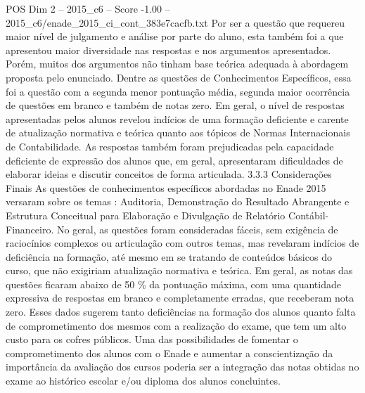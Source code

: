 \begin{textsample}{POS Dim 2 – 2015\_c6 – Score -1.00 – 2015\_c6/enade\_2015\_ci\_cont\_383e7cacfb.txt}
Por ser a questão que requereu maior nível de julgamento e análise por parte do aluno, esta também foi a que apresentou maior diversidade nas respostas e nos argumentos apresentados.
Porém, muitos dos argumentos não tinham base teórica adequada à abordagem proposta pelo enunciado.
Dentre as questões de Conhecimentos Específicos, essa foi a questão com a segunda menor pontuação média, segunda maior ocorrência de questões em branco e também de notas zero.
Em geral, o nível de respostas apresentadas pelos alunos revelou indícios de uma formação deficiente e carente de atualização normativa e teórica quanto aos tópicos de Normas Internacionais de Contabilidade.
As respostas também foram prejudicadas pela capacidade deficiente de expressão dos alunos que, em geral, apresentaram dificuldades de elaborar ideias e discutir conceitos de forma articulada. 3.3.3 Considerações Finais As questões de conhecimentos específicos abordadas no Enade 2015 versaram sobre os temas : Auditoria, Demonstração do Resultado Abrangente e Estrutura Conceitual para Elaboração e Divulgação de Relatório Contábil-Financeiro.
No geral, as questões foram consideradas fáceis, sem exigência de raciocínios complexos ou articulação com outros temas, mas revelaram indícios de deficiência na formação, até mesmo em se tratando de conteúdos básicos do curso, que não exigiriam atualização normativa e teórica.
Em geral, as notas das questões ficaram abaixo de 50 \% da pontuação máxima, com uma quantidade expressiva de respostas em branco e completamente erradas, que receberam nota zero.
Esses dados sugerem tanto deficiências na formação dos alunos quanto falta de comprometimento dos mesmos com a realização do exame, que tem um alto custo para os cofres públicos.
Uma das possibilidades de fomentar o comprometimento dos alunos com o Enade e aumentar a conscientização da importância da avaliação dos cursos poderia ser a integração das notas obtidas no exame ao histórico escolar e/ou diploma dos alunos concluintes.

\end{textsample}
